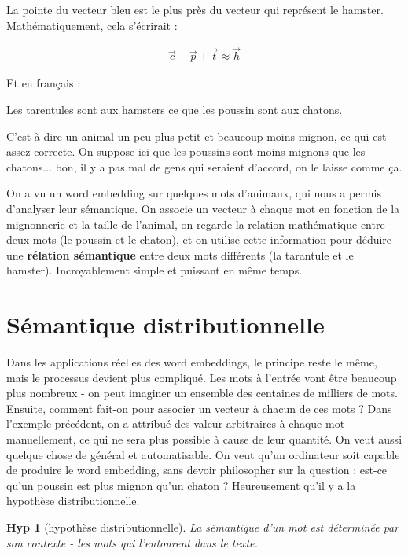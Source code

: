 \documentclass[11pt, a4paper]{report}
\newtheorem{hyp}{Hyp}[section]
\begin{document}
La pointe du vecteur bleu est le plus près du vecteur qui représent le hamster.
Mathématiquement, cela s'écrirait :

\begin{align*}
  \vec{c} - \vec{p} + \vec{t} \approx \vec{h} 
\end{align*}

Et en français : 

\begin{center}
  Les tarentules sont aux hamsters ce que les poussin sont aux chatons. 
\end{center}

C'est-à-dire un animal un peu plus petit et beaucoup moins mignon, ce qui est assez 
correcte. On suppose ici que les poussins sont moins mignons que les chatons... bon, 
il y a pas mal de gens qui seraient d'accord, on le laisse comme ça. 

On a vu un word embedding sur quelques mots d'animaux, qui nous a permis d'analyser leur sémantique.  
On associe un vecteur à chaque mot en fonction de la mignonnerie et la 
taille de l'animal, on regarde la relation mathématique entre deux mots
(le poussin et le chaton), et on utilise cette information pour déduire une \textbf{rélation sémantique} 
entre deux mots différents (la tarantule et le hamster). 
Incroyablement simple et puissant en même temps.

\section{Sémantique distributionnelle}
\cite{wikipedia-distributional-semantics} Dans les applications réelles des word embeddings, le principe reste le même, mais le processus devient plus 
compliqué. Les mots à l'entrée vont être beaucoup plus nombreux - on peut imaginer un ensemble 
des centaines de milliers de mots. Ensuite, comment fait-on pour associer un vecteur à chacun
de ces mots ? Dans l'exemple précédent, on a attribué des valeur arbitraires à chaque mot 
manuellement, ce qui ne sera plus possible à cause de leur quantité. On veut aussi quelque chose de général et 
automatisable. On veut qu'un ordinateur soit capable de produire le word embedding, sans devoir philosopher 
sur la question : est-ce qu'un poussin est plus mignon qu'un chaton ? Heureusement qu'il y a la 
hypothèse distributionnelle. 

\begin{hyp}[hypothèse distributionnelle]
  La sémantique d'un mot est déterminée par son contexte - les mots qui l'entourent dans 
  le texte. 
\end{hyp}
\end{document}
